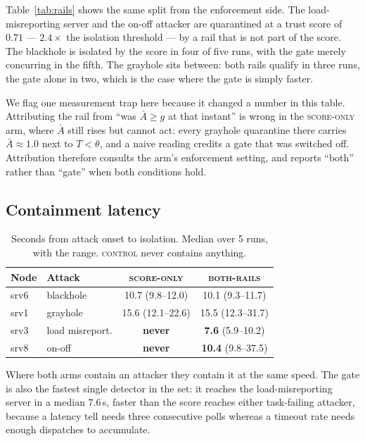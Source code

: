 \documentclass[10pt,twocolumn,letterpaper]{article}
\newcommand{\Tscore}{T}
\newcommand{\Agate}{\bar{A}}
\newcommand{\armbase}{\textsc{control}}
\newcommand{\armscore}{\textsc{score-only}}
\newcommand{\armfull}{\textsc{both-rails}}
\begin{document}
Table~\ref{tab:rails} shows the same split from the enforcement side. The
load-misreporting server and the on-off attacker are quarantined at a trust score of $0.71$ --- $2.4
\times$ the isolation threshold --- by a rail that is not part of the score.
The blackhole is isolated by the score in four of five runs, with the gate
merely concurring in the fifth. The grayhole sits between: both rails qualify
in three runs, the gate alone in two, which is the case where the gate is
simply faster.

We flag one measurement trap here because it changed a number in this table.
Attributing the rail from ``was $\Agate \ge g$ at that instant'' is wrong in
the \armscore{} arm, where $\Agate$ still rises but cannot act: every grayhole
quarantine there carries $\Agate \approx 1.0$ next to $\Tscore < \theta$, and a
naive reading credits a gate that was switched off. Attribution therefore
consults the arm's enforcement setting, and reports ``both'' rather than
``gate'' when both conditions hold.

\subsection{Containment latency}
\label{sec:res:contain}

\begin{table}[t]
\caption{Seconds from attack onset to isolation. Median over 5 runs, with the
range. \armbase{} never contains anything.}
\label{tab:contain}
\centering\footnotesize
\begin{tabular}{@{}llcc@{}}
\toprule
\textbf{Node} & \textbf{Attack} & \armscore{} & \armfull{}\\
\midrule
srv6 & blackhole & 10.7 (9.8--12.0)  & 10.1 (9.3--11.7)\\
srv1 & grayhole  & 15.6 (12.1--22.6) & 15.5 (12.3--31.7)\\
srv3 & load misreport. & \textbf{never}    & \textbf{7.6} (5.9--10.2)\\
srv8 & on-off    & \textbf{never}    & \textbf{10.4} (9.8--37.5)\\
\bottomrule
\end{tabular}
\end{table}

Where both arms contain an attacker they contain it at the same speed. The
gate is also the fastest single detector in the set: it reaches the
load-misreporting server in a median $7.6$\,s, faster than the score reaches
either task-failing attacker, because a latency tell needs three consecutive
polls whereas a timeout rate needs enough dispatches to accumulate.
\end{document}

